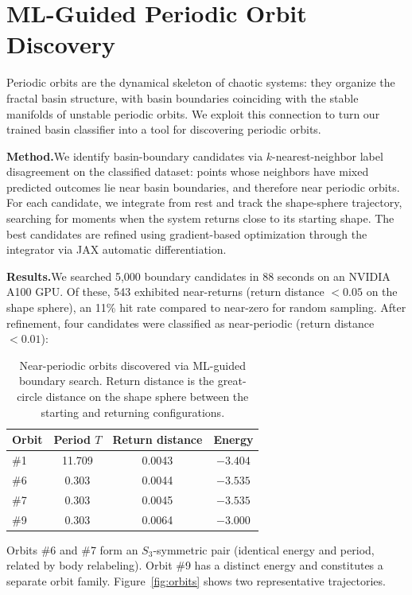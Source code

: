 \documentclass[10pt]{article}
\begin{document}
\section{ML-Guided Periodic Orbit Discovery}

Periodic orbits are the dynamical skeleton of chaotic systems: they organize the fractal basin structure, with basin boundaries coinciding with the stable manifolds of unstable periodic orbits. We exploit this connection to turn our trained basin classifier into a tool for discovering periodic orbits.

\textbf{Method.}\quad We identify basin-boundary candidates via $k$-nearest-neighbor label disagreement on the classified dataset: points whose neighbors have mixed predicted outcomes lie near basin boundaries, and therefore near periodic orbits. For each candidate, we integrate from rest and track the shape-sphere trajectory, searching for moments when the system returns close to its starting shape. The best candidates are refined using gradient-based optimization through the integrator via JAX automatic differentiation.

\textbf{Results.}\quad We searched 5{,}000 boundary candidates in 88 seconds on an NVIDIA A100 GPU. Of these, 543 exhibited near-returns (return distance $<0.05$ on the shape sphere), an 11\% hit rate compared to near-zero for random sampling. After refinement, four candidates were classified as near-periodic (return distance $<0.01$):

\begin{table}[t]
\centering
\caption{Near-periodic orbits discovered via ML-guided boundary search. Return distance is the great-circle distance on the shape sphere between the starting and returning configurations.}
\label{tab:orbits}
\begin{tabular}{lccc}
\toprule
Orbit & Period $T$ & Return distance & Energy \\
\midrule
\#1 & 11.709 & 0.0043 & $-3.404$ \\
\#6 & 0.303 & 0.0044 & $-3.535$ \\
\#7 & 0.303 & 0.0045 & $-3.535$ \\
\#9 & 0.303 & 0.0064 & $-3.000$ \\
\bottomrule
\end{tabular}
\end{table}

Orbits \#6 and \#7 form an $S_3$-symmetric pair (identical energy and period, related by body relabeling). Orbit \#9 has a distinct energy and constitutes a separate orbit family. Figure~\ref{fig:orbits} shows two representative trajectories.
\end{document}
